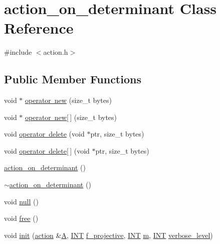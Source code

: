 \hypertarget{classaction__on__determinant}{}\section{action\+\_\+on\+\_\+determinant Class Reference}
\label{classaction__on__determinant}


{\ttfamily \#include $<$action.\+h$>$}

\subsection*{Public Member Functions}
\begin{DoxyCompactItemize}
\item 
void $\ast$ \mbox{\hyperlink{classaction__on__determinant_a5ee12743f4b70cc7a24e563d04d679f5}{operator new}} (size\+\_\+t bytes)
\item 
void $\ast$ \mbox{\hyperlink{classaction__on__determinant_aa06fbc31e1750976856667693743fc39}{operator new\mbox{[}$\,$\mbox{]}}} (size\+\_\+t bytes)
\item 
void \mbox{\hyperlink{classaction__on__determinant_a66b6cfe03050edc6b2ba286322aa0573}{operator delete}} (void $\ast$ptr, size\+\_\+t bytes)
\item 
void \mbox{\hyperlink{classaction__on__determinant_aaba0d2f7628b1b84159b163130710688}{operator delete\mbox{[}$\,$\mbox{]}}} (void $\ast$ptr, size\+\_\+t bytes)
\item 
\mbox{\hyperlink{classaction__on__determinant_a76a6fbf2de8fe0b5f58803fd0559fe46}{action\+\_\+on\+\_\+determinant}} ()
\item 
\mbox{\hyperlink{classaction__on__determinant_a60ea190130efecae323612307c9680aa}{$\sim$action\+\_\+on\+\_\+determinant}} ()
\item 
void \mbox{\hyperlink{classaction__on__determinant_a618fbf430ffebd648cd1a2d397bfc195}{null}} ()
\item 
void \mbox{\hyperlink{classaction__on__determinant_a944af69537b20b45c90a4740bb105d8d}{free}} ()
\item 
void \mbox{\hyperlink{classaction__on__determinant_a2fea52d41ce31ebca3ff12758c37fe6d}{init}} (\mbox{\hyperlink{classaction}{action}} \&\mbox{\hyperlink{simeon_8_c_a97833f04c3a9c008df5521a2fc291bb4}{A}}, \mbox{\hyperlink{galois_8h_a09fddde158a3a20bd2dcadb609de11dc}{I\+NT}} \mbox{\hyperlink{classaction__on__determinant_a38c6c5a89bb4136a51b0d9eefe53a3b4}{f\+\_\+projective}}, \mbox{\hyperlink{galois_8h_a09fddde158a3a20bd2dcadb609de11dc}{I\+NT}} \mbox{\hyperlink{classaction__on__determinant_abbe59a289ccf21444b90616a98f3aff2}{m}}, \mbox{\hyperlink{galois_8h_a09fddde158a3a20bd2dcadb609de11dc}{I\+NT}} \mbox{\hyperlink{simeon_8_c_a818073fbcc2f439e7c56952f67386122}{verbose\+\_\+level}})

\end{DoxyCompactItemize}
